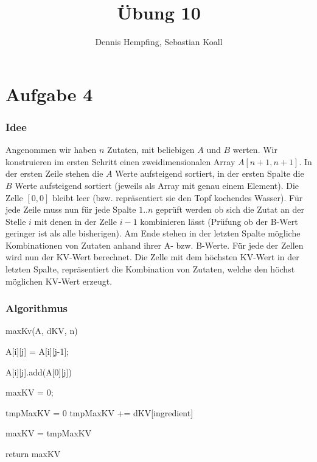 \documentclass[12pt]{scrartcl}%
\theoremstyle{nonumberplain}
\begin{document}
\author{Dennis Hempfing, Sebastian Koall}
\title{Übung 10}
\date{} 
\pagestyle{myheadings}

\maketitle %

\section*{Aufgabe 4}

\subsubsection*{Idee}
Angenommen wir haben $n$ Zutaten, mit beliebigen $A$ und $B$ werten. Wir konstruieren im ersten Schritt einen zweidimensionalen Array $A[n+1, n+1]$.
In der ersten Zeile stehen die $A$ Werte aufsteigend sortiert, in der ersten Spalte die $B$ Werte aufsteigend sortiert (jeweils als Array mit genau einem Element). Die Zelle $[0,0]$ bleibt leer 
(bzw. repräsentiert sie den Topf kochendes Wasser). 
Für jede Zeile muss nun für jede Spalte $1..n$ geprüft werden ob sich die Zutat an der Stelle $i$ mit denen in der Zelle $i-1$ kombinieren lässt (Prüfung ob der B-Wert geringer ist als alle bisherigen). Am Ende stehen in der letzten Spalte mögliche Kombinationen von Zutaten anhand ihrer A- bzw. B-Werte. Für jede der Zellen wird nun der KV-Wert berechnet. Die Zelle
mit dem höchsten KV-Wert in der letzten Spalte, repräsentiert die Kombination von Zutaten, welche den höchst möglichen KV-Wert erzeugt.

\subsubsection*{Algorithmus}

\begin{algorithm}[H]
	\LinesNumbered
	\caption{maxKv(A, dKV, n)}
	
	
	\BlankLine
	\BlankLine
	
	 {
		 {
			A[i][j] = A[i][j-1];
			
			 {
				A[i][j].add(A[0][j])\;
			}
		}
	}
	
	\BlankLine
	\BlankLine
	
	maxKV = 0;
	
	 {
		tmpMaxKV = 0\;
		 {
			tmpMaxKV += dKV[ingredient]\;
		}
		
		 {
			maxKV = tmpMaxKV\;
		}
	}
	
	\BlankLine
	\BlankLine
	
	return maxKV\;
\end{algorithm}
\end{document}
